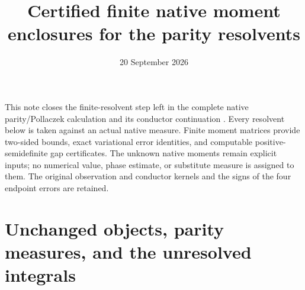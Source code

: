 \documentclass[11pt]{article}
\title{Certified finite native moment enclosures for the parity resolvents}
\author{}
\date{20 September 2026}
\begin{document}
\maketitle

This note closes the finite-resolvent step left in the complete native
parity/Pollaczek calculation \cite{PP} and its conductor continuation
\cite{TR}.  Every resolvent below is taken against an actual native
measure.  Finite moment matrices provide two-sided bounds, exact
variational error identities, and computable positive-semidefinite gap
certificates.  The unknown native moments remain explicit inputs; no
numerical value, phase estimate, or substitute measure is assigned to
them.  The original observation and conductor kernels and the signs of
the four endpoint errors are retained.

\section{Unchanged objects, parity measures, and the unresolved integrals}
\end{document}
